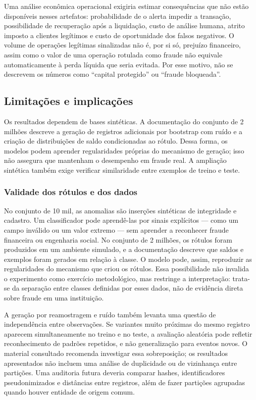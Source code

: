 \documentclass[11pt,a4paper]{article}
\begin{document}
Uma análise econômica operacional exigiria estimar consequências que não estão disponíveis nesses artefatos: probabilidade de o alerta impedir a transação, possibilidade de recuperação após a liquidação, custo de análise humana, atrito imposto a clientes legítimos e custo de oportunidade dos falsos negativos. O volume de operações legítimas sinalizadas não é, por si só, prejuízo financeiro, assim como o valor de uma operação rotulada como fraude não equivale automaticamente à perda líquida que seria evitada. Por esse motivo, não se descrevem os números como “capital protegido” ou “fraude bloqueada”.

\subsection{Limitações e implicações}

Os resultados dependem de bases sintéticas. A documentação do conjunto de 2 milhões descreve a geração de registros adicionais por bootstrap com ruído e a criação de distribuições de saldo condicionadas ao rótulo. Dessa forma, os modelos podem aprender regularidades próprias do mecanismo de geração; isso não assegura que mantenham o desempenho em fraude real. A ampliação sintética também exige verificar similaridade entre exemplos de treino e teste.

\subsubsection{Validade dos rótulos e dos dados}

No conjunto de 10 mil, as anomalias são inserções sintéticas de integridade e cadastro. Um classificador pode aprendê-las por sinais explícitos — como um campo inválido ou um valor extremo — sem aprender a reconhecer fraude financeira ou engenharia social. No conjunto de 2 milhões, os rótulos foram produzidos em um ambiente simulado, e a documentação descreve que saldos e exemplos foram gerados em relação à classe. O modelo pode, assim, reproduzir as regularidades do mecanismo que criou os rótulos. Essa possibilidade não invalida o experimento como exercício metodológico, mas restringe a interpretação: trata-se da separação entre classes definidas por esses dados, não de evidência direta sobre fraude em uma instituição.

A geração por reamostragem e ruído também levanta uma questão de independência entre observações. Se variantes muito próximas do mesmo registro aparecem simultaneamente no treino e no teste, a avaliação aleatória pode refletir reconhecimento de padrões repetidos, e não generalização para eventos novos. O material consultado recomenda investigar essa sobreposição; os resultados apresentados não incluem uma análise de duplicidade ou de vizinhança entre partições. Uma auditoria futura deveria comparar hashes, identificadores pseudonimizados e distâncias entre registros, além de fazer partições agrupadas quando houver entidade de origem comum.
\end{document}
